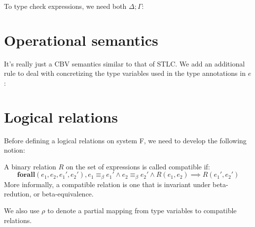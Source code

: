 \documentclass{notes}
\newcommand{\unit}{()}
\newcommand{\Unit}{\texttt{unit}}
\newcommand{\bequiv}{\equiv_{\beta}}
\begin{document}
To type check expressions, we need both $\Delta;\Gamma$:


\section{Operational semantics}
It's really just a CBV semantics similar to that of STLC. We add an additional rule to deal with concretizing the type variables used in the type annotations in $e$:
\begin{mathpar}
\end{mathpar}

\section{Logical relations}

Before defining a logical relations on system F, we need to develop the following notion:

\begin{defn}
  A binary relation $R$ on the set of expressions is called compatible if:
  \[\textbf{forall}(e_1,e_2,e_1',e_2'), e_1\bequiv e_1'\land e_2\bequiv e_2'\land R(e_1, e_2)\implies R(e_1',e_2')\]
  More informally, a compatible relation is one that is invariant under beta-redution, or beta-equivalence.
\end{defn}

We also use $\rho$ to denote a partial mapping from type variables to compatible relations.
\end{document}

